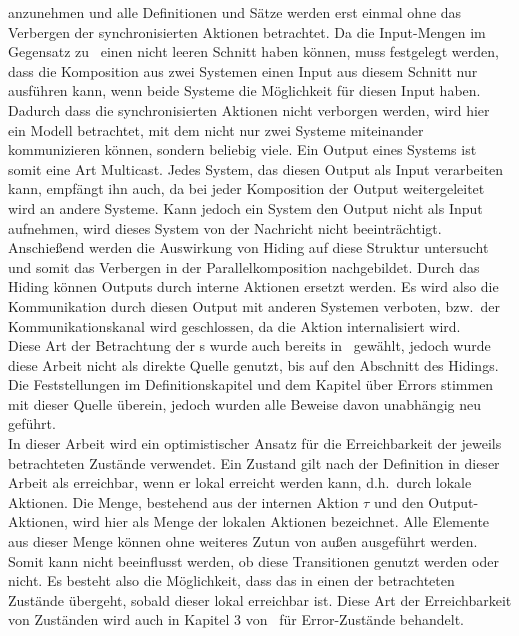 anzunehmen und alle Definitionen und Sätze werden erst einmal ohne das
Verbergen der synchronisierten Aktionen betrachtet. Da die Input-Mengen im
Gegensatz zu~\cite{Vogler2014EIO} einen
nicht leeren Schnitt haben können, muss festgelegt werden, dass die Komposition
aus zwei Systemen einen Input aus diesem Schnitt nur ausführen kann, wenn beide
Systeme die Möglichkeit für diesen Input haben.\\
Dadurch dass die synchronisierten Aktionen nicht verborgen werden, wird hier
ein Modell betrachtet, mit dem nicht nur zwei Systeme miteinander kommunizieren können,
sondern beliebig viele. Ein Output eines Systems ist somit eine Art Multicast.
Jedes System, das diesen Output als Input verarbeiten kann, empfängt ihn auch,
da bei jeder Komposition der Output weitergeleitet wird an andere Systeme.
Kann jedoch ein System den Output nicht als Input aufnehmen, wird dieses System von
der Nachricht nicht beeinträchtigt.\\
Anschießend werden die Auswirkung von Hiding auf diese Struktur
untersucht und somit das Verbergen in der Parallelkomposition nachgebildet.
Durch das Hiding können Outputs durch interne Aktionen ersetzt werden. Es wird
also die Kommunikation durch diesen Output mit anderen Systemen verboten, bzw.\
der Kommunikationskanal wird geschlossen, da die Aktion internalisiert wird.\\
Diese Art der Betrachtung der
\EIO{}s wurde auch bereits in~\cite{Schlosser2012BA} gewählt, jedoch wurde
diese Arbeit nicht als direkte Quelle genutzt, bis auf den Abschnitt des
Hidings. Die Feststellungen im Definitionskapitel und dem Kapitel über
Errors stimmen mit dieser Quelle überein, jedoch wurden alle Beweise davon unabhängig neu
geführt.\\
In dieser Arbeit wird ein optimistischer Ansatz für die Erreichbarkeit
der jeweils betrachteten Zustände verwendet. Ein Zustand gilt nach der Definition in dieser
Arbeit als erreichbar, wenn er lokal erreicht
werden kann, d.h.\ durch lokale Aktionen. Die Menge, bestehend aus der internen
Aktion $\tau$ und den Output-Aktionen, wird hier als Menge der lokalen Aktionen
bezeichnet.
Alle Elemente aus dieser Menge können ohne weiteres Zutun von außen ausgeführt
werden. Somit kann nicht beeinflusst werden, ob diese Transitionen genutzt
werden oder nicht. Es besteht also die Möglichkeit, dass das \EIO{} in einen
der betrachteten Zustände übergeht, sobald dieser lokal erreichbar ist. Diese Art der
Erreichbarkeit von Zuständen wird auch in Kapitel 3 von~\cite{Vogler2014EIO}
für Error-Zustände behandelt.\\
